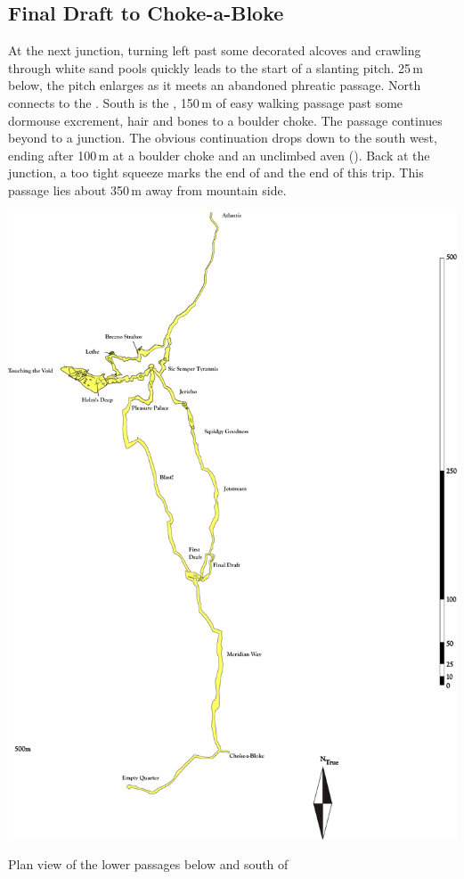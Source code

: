 \subsection{Final Draft to Choke-a-Bloke}
At the next junction, turning left past some decorated alcoves and crawling through white sand pools quickly leads to the start of a slanting pitch. 25\,m below, the pitch enlarges as it meets an abandoned phreatic passage. North connects to the . South is the , 150\,m of easy walking passage past some dormouse excrement, hair and bones to a boulder choke. The passage continues beyond to a junction. The obvious continuation drops down to the south west, ending after 100\,m at a boulder choke and an unclimbed aven (). Back at the junction, a too tight squeeze marks the end of  and the end of this trip. This passage lies about 350\,m away from mountain side.

\begin{pagesurvey}
\checkoddpage \ifoddpage \forcerectofloat \else \forceversofloat \fi
\centering
\includegraphics[width=\textwidth]{images/pdf_maps/paradisesouth.pdf}
\caption[Below Stuck in Paradise]{Plan view of the lower passages below and south of \protect{}}
\label{paradise}
\end{pagesurvey}